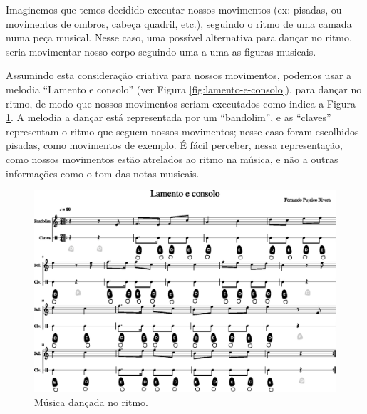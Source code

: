 

\begin{example}
\label{ex:dancaritmo1}
Imaginemos que temos decidido executar nossos movimentos (ex: pisadas, ou movimentos de ombros, cabeça quadril, etc.),
seguindo o ritmo de uma camada numa peça musical.
Nesse caso, uma possível alternativa para dançar no ritmo, 
seria movimentar nosso corpo seguindo uma a uma as figuras musicais.

Assumindo esta  consideração criativa para nossos movimentos, 
podemos usar a melodia ``Lamento e consolo'' (ver Figura \ref{fig:lamento-e-consolo}),
para dançar no ritmo, 
de modo que nossos movimentos seriam executados como indica a Figura \ref{fig:lamentoconsoloritmo1}.
A melodia a dançar está representada por um ``bandolim'',
e as ``claves'' representam o ritmo que seguem nossos movimentos;
nesse caso foram escolhidos pisadas, como movimentos de exemplo.
É fácil perceber, nessa representação, 
como nossos movimentos estão atrelados ao ritmo na música,
e não a outras informações como o tom das notas musicais.
\end{example}
\begin{figure}
    \centering
    \includegraphics[width=\textwidth]{chapters/cap-musicalidade-tecnica/lamento-e-consolo-clave-ritmo-1.eps}
    \caption{Música dançada no ritmo.}
    \label{fig:lamentoconsoloritmo1}
\end{figure}



